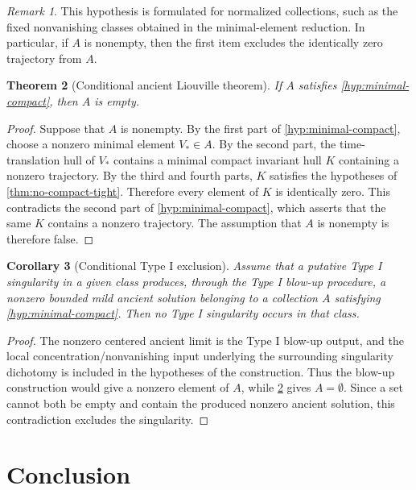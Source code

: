 \documentclass[11pt]{amsart}
\theoremstyle{plain}
\newtheorem{theorem}{Theorem}[section]
\newtheorem{corollary}[theorem]{Corollary}
\theoremstyle{definition}
\theoremstyle{remark}
\newtheorem{remark}[theorem]{Remark}
\numberwithin{equation}{section}
\begin{document}
\begin{remark}
This hypothesis is formulated for normalized collections, such as the fixed
nonvanishing classes obtained in the minimal-element reduction.  In
particular, if \(A\) is nonempty, then the first item excludes the
identically zero trajectory from \(A\).
\end{remark}

\begin{theorem}[Conditional ancient Liouville theorem]\label{thm:conditional-liouville}
If \(A\) satisfies \cref{hyp:minimal-compact}, then \(A\) is empty.
\end{theorem}

\begin{proof}
Suppose that \(A\) is nonempty.  By the first part of
\cref{hyp:minimal-compact}, choose a nonzero minimal element \(V_*\in A\).
By the second part, the time-translation hull of \(V_*\) contains a minimal
compact invariant hull \(K\) containing a nonzero trajectory.  By the third
and fourth parts, \(K\) satisfies the hypotheses of
\cref{thm:no-compact-tight}.  Therefore every element of \(K\) is identically
zero.  This contradicts the second part of
\cref{hyp:minimal-compact}, which asserts that the same \(K\) contains a
nonzero trajectory.  The assumption that \(A\) is nonempty is therefore false.
\end{proof}

\begin{corollary}[Conditional Type I exclusion]\label{cor:type-I-exclusion}
Assume that a putative Type I singularity in a given class produces, through
the Type I blow-up procedure, a nonzero bounded mild ancient solution belonging
to a collection \(A\) satisfying
\cref{hyp:minimal-compact}.  Then no Type I singularity occurs in that class.
\end{corollary}

\begin{proof}
The nonzero centered ancient limit is the Type I blow-up output, and the local
concentration/nonvanishing input underlying the surrounding singularity
dichotomy is included in the hypotheses of the construction.  Thus the blow-up
construction would give a nonzero element of \(A\), while
\cref{thm:conditional-liouville} gives \(A=\emptyset\).  Since a set cannot
both be empty and contain the produced nonzero ancient solution, this
contradiction excludes the singularity.
\end{proof}

\section{Conclusion}
\end{document}

